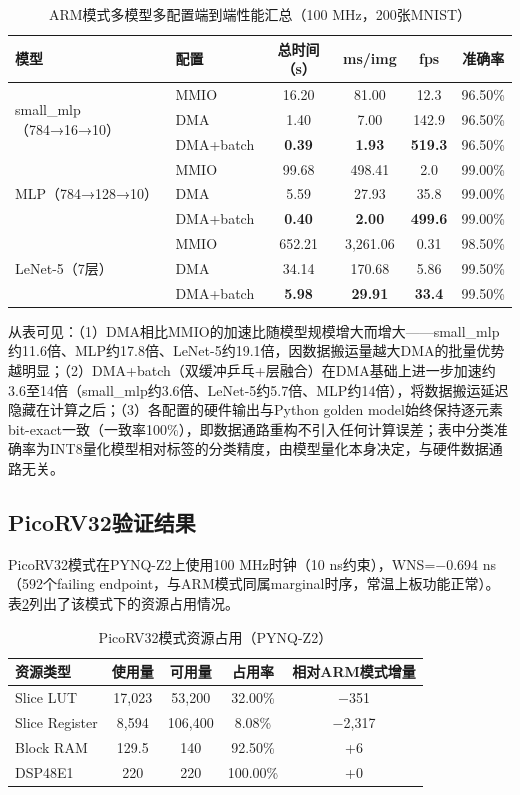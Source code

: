 \documentclass[12pt, a4paper]{article}
\begin{document}
\begin{table}[H]
	\centering
	\caption{ARM模式多模型多配置端到端性能汇总（100 MHz，200张MNIST）}
	\label{tab:arm_multi_model}
	\small
	\begin{tabular}{llcccc}
		\toprule
		模型 & 配置 & 总时间（s） & ms/img & fps & 准确率 \\
		\midrule
		\multirow{3}{*}{small\_mlp（784→16→10）} & MMIO & 16.20 & 81.00 & 12.3 & 96.50\% \\
		& DMA & 1.40 & 7.00 & 142.9 & 96.50\% \\
		& DMA+batch & \textbf{0.39} & \textbf{1.93} & \textbf{519.3} & 96.50\% \\
		\midrule
		\multirow{3}{*}{MLP（784→128→10）} & MMIO & 99.68 & 498.41 & 2.0 & 99.00\% \\
		& DMA & 5.59 & 27.93 & 35.8 & 99.00\% \\
		& DMA+batch & \textbf{0.40} & \textbf{2.00} & \textbf{499.6} & 99.00\% \\
		\midrule
		\multirow{3}{*}{LeNet-5（7层）} & MMIO & 652.21 & 3,261.06 & 0.31 & 98.50\% \\
		& DMA & 34.14 & 170.68 & 5.86 & 99.50\% \\
		& DMA+batch & \textbf{5.98} & \textbf{29.91} & \textbf{33.4} & 99.50\% \\
		\bottomrule
	\end{tabular}
\end{table}

从表可见：（1）DMA相比MMIO的加速比随模型规模增大而增大——small\_mlp约11.6倍、MLP约17.8倍、LeNet-5约19.1倍，因数据搬运量越大DMA的批量优势越明显；（2）DMA+batch（双缓冲乒乓+层融合）在DMA基础上进一步加速约3.6至14倍（small\_mlp约3.6倍、LeNet-5约5.7倍、MLP约14倍），将数据搬运延迟隐藏在计算之后；（3）各配置的硬件输出与Python golden model始终保持逐元素bit-exact一致（一致率100\%），即数据通路重构不引入任何计算误差；表中分类准确率为INT8量化模型相对标签的分类精度，由模型量化本身决定，与硬件数据通路无关。

\subsection{PicoRV32验证结果}

PicoRV32模式在PYNQ-Z2上使用100 MHz时钟（10 ns约束），WNS=$-$0.694 ns（592个failing endpoint，与ARM模式同属marginal时序，常温上板功能正常）。表\ref{tab:util_rv32}列出了该模式下的资源占用情况。

\begin{table}[H]
	\centering
	\caption{PicoRV32模式资源占用（PYNQ-Z2）}
	\begin{tabular}{lcccc}
		\toprule
		资源类型 & 使用量 & 可用量 & 占用率 & 相对ARM模式增量 \\
		\midrule
		Slice LUT & 17,023 & 53,200 & 32.00\% & $-$351 \\
		Slice Register & 8,594 & 106,400 & 8.08\% & $-$2,317 \\
		Block RAM & 129.5 & 140 & 92.50\% & +6 \\
		DSP48E1 & 220 & 220 & 100.00\% & +0 \\
		\bottomrule
	\end{tabular}
	\label{tab:util_rv32}
\end{table}
\end{document}
